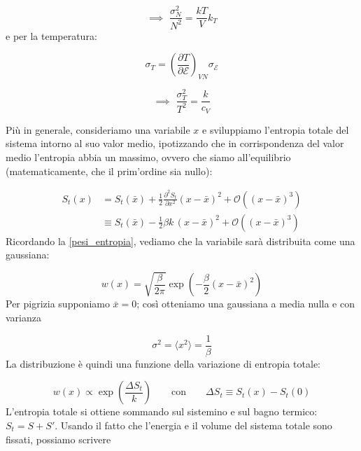 \documentclass[a4paper]{report}
\begin{document}
\begin{equation}
    \implies \,\,\frac{\sigma_N^2}{N^2} = \frac{k T}{V} k_T
\end{equation}
e per la temperatura:

\begin{equation}
    \sigma_T = \left(\frac{\partial T}{\partial \mathcal{E}}\right)_{VN} \sigma_\mathcal{E}
\end{equation}

\begin{equation}
    \implies \,\,\frac{\sigma_T^2}{T^2} = \frac{k}{c_V}
\end{equation}

Più in generale, consideriamo una variabile $x$ e sviluppiamo l'entropia totale del sistema intorno al suo valor medio, ipotizzando che in corrispondenza del valor medio l'entropia abbia un massimo, ovvero che siamo all'equilibrio (matematicamente, che il prim'ordine sia nullo):

\begin{equation}
\begin{split}
    S_t(x) & = S_t(\bar{x}) + \frac{1}{2}\frac{\partial^2 S_t}{\partial x^2} (x-\bar{x})^2 + \mathcal{O}((x-\bar{x})^3) \\
    & \equiv S_t(\bar{x}) - \frac{1}{2}\beta k \,(x-\bar{x})^2 + \mathcal{O}((x-\bar{x})^3)
\end{split}
\end{equation}
Ricordando la \eqref{pesi_entropia}, vediamo che la variabile sarà distribuita come una gaussiana:

\begin{equation}
     w(x) = \sqrt{\frac{\beta}{2\pi }} \exp\left(-\frac{\beta}{2}(x-\bar{x})^2\right)
\end{equation}
Per pigrizia supponiamo $\bar{x} = 0$; così otteniamo una gaussiana a media nulla e con varianza

\begin{equation}
    \sigma^2 = \langle x^2 \rangle = \frac{1}{\beta}
\end{equation}
La distribuzione è quindi una funzione della variazione di entropia totale:

\begin{equation}
   w(x) \propto \exp\left(\frac{\Delta S_t}{k}\right) \qquad \text{con} \qquad \Delta S_t \equiv S_t(x) - S_t(0)
\end{equation}
L'entropia totale si ottiene sommando sul sistemino e sul bagno termico: $S_t = S+S'$. Usando il fatto che l'energia e il volume del sistema totale sono fissati, possiamo scrivere
\end{document}
